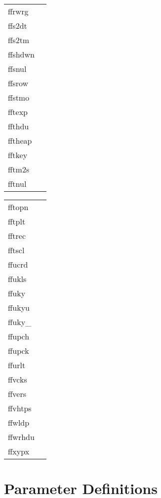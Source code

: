 \documentclass[11pt]{book}
\begin{document}
\begin{tabular}{lr}
ffrwrg    & \pageref{ffrwrg} \\
ffs2dt  & \pageref{ffdt2s} \\
ffs2tm  & \pageref{ffdt2s} \\
ffshdwn  & \pageref{ffshdwn} \\
ffsnul   & \pageref{ffsnul} \\
ffsrow  & \pageref{ffsrow} \\
ffstmo  & \pageref{ffgtmo} \\
fftexp    & \pageref{fftexp} \\
ffthdu   & \pageref{ffthdu} \\
fftheap  & \pageref{fftheap} \\
fftkey   & \pageref{fftkey} \\
fftm2s  & \pageref{ffdt2s} \\
fftnul   & \pageref{fftnul} \\


\end{tabular}
\newpage
\begin{tabular}{lr}

fftopn & \pageref{ffopen} \\
fftplt & \pageref{fftplt} \\
fftrec    & \pageref{fftrec} \\
fftscl     & \pageref{fftscl} \\
ffucrd       & \pageref{ffucrd} \\
ffukls    & \pageref{ffukyx} \\
ffuky        & \pageref{ffuky} \\
ffukyu   & \pageref{ffukyu} \\
ffuky\_    & \pageref{ffukyx} \\
ffupch      & \pageref{ffupch} \\
ffupck  & \pageref{ffupck} \\
ffurlt  & \pageref{ffurlt} \\
ffvcks  & \pageref{ffvcks} \\
ffvers    & \pageref{ffvers} \\
ffvhtps  & \pageref{ffvhtps} \\
ffwldp & \pageref{ffwldp} \\
ffwrhdu  & \pageref{ffwrhdu} \\
ffxypx & \pageref{ffxypx} \\

\end{tabular}


\chapter{Parameter Definitions }
\end{document}
